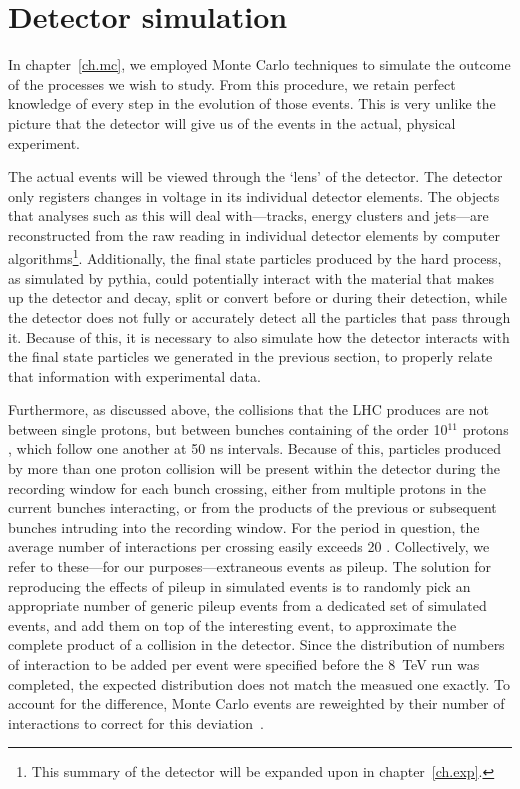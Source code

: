 \section{Detector simulation}
In chapter~\ref{ch.mc}, we employed Monte Carlo techniques to simulate the outcome of the processes we wish to study. From this procedure, we retain perfect knowledge of every step in the evolution of those events. This is very unlike the picture that the detector will give us of the events in the actual, physical experiment.

The actual events will be viewed through the `lens' of the \atlas{} detector. The detector only registers changes in voltage in its individual detector elements. The objects that analyses such as this will deal with---tracks, energy clusters and jets---are reconstructed from the raw reading in individual detector elements by computer algorithms\footnote{This summary of the \atlas{} detector will be expanded upon in chapter~\ref{ch.exp}.}. Additionally, the final state particles produced by the hard process, as simulated by pythia, could potentially interact with the material that makes up the detector and decay, split or convert before or during their detection, while the detector does not fully or accurately detect all the particles that pass through it. Because of this, it is necessary to also simulate how the detector interacts with the final state particles we generated in the previous section, to properly relate that information with experimental data.

Furthermore, as discussed above, the collisions that the LHC produces are not between single protons, but between bunches containing of the order 10$^{11}$ protons \cite{cernbro}, which follow one another at 50 ns intervals. Because of this, particles produced by more than one proton collision will be present within the \atlas{} detector during the recording window for each bunch crossing, either from multiple protons in the current bunches interacting, or from the products of the previous or subsequent bunches intruding into the recording window. For the period in question, the average number of interactions per crossing easily exceeds 20 \cite{publiclumi}. Collectively, we refer to these---for our purposes---extraneous events as pileup. The solution for reproducing the effects of pileup in simulated events is to randomly pick an appropriate number of generic pileup events from a dedicated set of simulated events, and add them on top of the interesting event, to approximate the complete product of a collision in the detector. Since the distribution of numbers of interaction to be added per event were specified before the 8~TeV run was completed, the expected distribution does not match the measued one exactly. To account for the difference, Monte Carlo events are reweighted by their number of interactions to correct for this deviation~\cite{pileuprew}.

